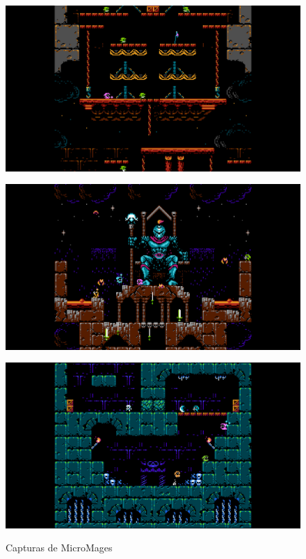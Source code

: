 \begin{figure}[H]
    \centering
    \begin{minipage}{0.40\textwidth}
        \centering
        \includegraphics[width=1.0\textwidth]{Cuerpo/4/MM1.jpg} %
        \label{UCH-Nivel}
    \end{minipage}\hfill
    \begin{minipage}{0.40\textwidth}
        \centering
        \includegraphics[width=1.0\textwidth]{Cuerpo/4/MM2.jpg} %
        \label{MM-Jefes}
    \end{minipage}
    \centering
    \begin{minipage}{0.40\textwidth}
        \centering
        \includegraphics[width=1.0\textwidth]{Cuerpo/4/MM3.jpg} %
        \label{MM-Jugadores}
    \end{minipage}
    \caption{Capturas de MicroMages}
\end{figure}

